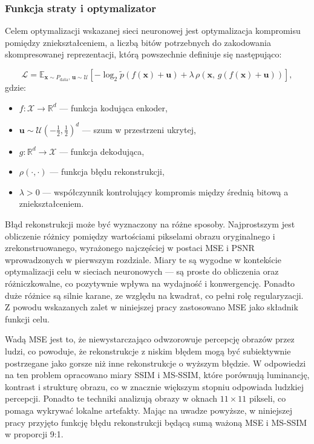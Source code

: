 \subsubsection{Funkcja straty i optymalizator}
\begin{sloppypar}
Celem optymalizacji wskazanej sieci neuronowej jest optymalizacja kompromisu pomiędzy zniekształceniem, a liczbą bitów potrzebnych do zakodowania skompresowanej reprezentacji, którą powszechnie definiuje się następująco\cite{arezki2024universalendtoendneuralnetwork}:
\end{sloppypar}
\begin{equation}
	\mathcal{L} = \mathbb{E}_{\mathbf{x} \sim P_{\text{data}},\, \mathbf{u} \sim \mathcal{U}}
		\left[ -\log_{2} \tilde{p}\!\left(f(\mathbf{x}) + \mathbf{u}\right) + \lambda\, \rho\! \left( 
			\mathbf{x},\, g(f(\mathbf{x}) + \mathbf{u})
		\right)
	\right],
\end{equation}
\noindent gdzie:
\begin{itemize}
	\item $f : \mathcal{X} \to \mathbb{R}^d$ --- funkcja kodująca enkoder,
	\item $\mathbf{u} \sim \mathcal{U}(-\frac{1}{2}, \frac{1}{2})^{d}$ --- szum w przestrzeni ukrytej,
	\item $g : \mathbb{R}^d \to \mathcal{X}$ --- funkcja dekodująca,
	\item $\rho(\cdot,\cdot)$ --- funkcja błędu rekonstrukcji,
	\item $\lambda > 0$ --- współczynnik kontrolujący kompromis między średnią bitową a zniekształceniem.
\end{itemize}

Błąd rekonstrukcji może być wyznaczony na różne sposoby. Najprostszym jest obliczenie różnicy pomiędzy wartościami pikselami obrazu oryginalnego i zrekonstruowanego, wyrażonego najczęściej w postaci MSE i PSNR wprowadzonych w pierwszym rozdziale. Miary te są wygodne w kontekście optymalizacji celu w sieciach neuronowych --- są proste do obliczenia oraz różniczkowalne, co pozytywnie wpływa na wydajność i konwergencję. Ponadto duże różnice są silnie karane, ze względu na kwadrat, co pełni rolę regularyzacji. Z powodu wskazanych zalet w niniejszej pracy zastosowano MSE jako składnik funkcji celu.

Wadą MSE jest to, że niewystarczająco odwzorowuje percepcję obrazów przez ludzi, co powoduje, że rekonstrukcje z niskim błędem mogą być subiektywnie postrzegane jako gorsze niż inne rekonstrukcje o wyższym błędzie\cite{girod1993whatswrongmse}. W odpowiedzi na ten problem opracowano miary SSIM\cite{wang2004ssim} i MS-SSIM\cite{1292216}, które porównują luminancję, kontrast i strukturę obrazu, co w znacznie większym stopniu odpowiada ludzkiej percepcji. Ponadto te techniki analizują obrazy w oknach \( 11 \times 11 \) pikseli, co pomaga wykrywać lokalne artefakty. Mając na uwadze powyższe, w niniejszej pracy przyjęto funkcję błędu rekonstrukcji będącą sumą ważoną MSE i MS-SSIM w proporcji 9:1.


